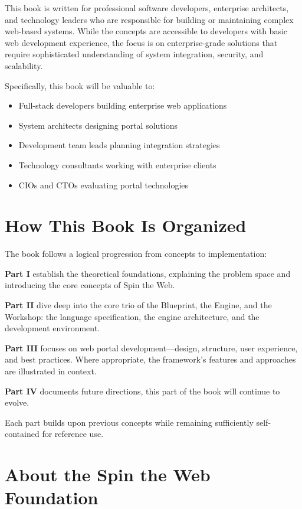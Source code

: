 This book is written for professional software developers, enterprise architects, and technology leaders who are responsible for building or maintaining complex web-based systems. While the concepts are accessible to developers with basic web development experience, the focus is on enterprise-grade solutions that require sophisticated understanding of system integration, security, and scalability.

Specifically, this book will be valuable to:
\begin{itemize}
\item Full-stack developers building enterprise web applications
\item System architects designing portal solutions
\item Development team leads planning integration strategies
\item Technology consultants working with enterprise clients
\item CIOs and CTOs evaluating portal technologies
\end{itemize}

\section*{How This Book Is Organized}

The book follows a logical progression from concepts to implementation:

\textbf{Part I} establish the theoretical foundations, explaining the problem space and introducing the core concepts of Spin the Web.

\textbf{Part II} dive deep into the core trio of the Blueprint, the Engine, and the Workshop: the \wbdl language specification, the \webspinner engine architecture, and the \studio development environment.

\textbf{Part III} focuses on web portal development—design, structure, user experience, and best practices. Where appropriate, the framework’s features and approaches are illustrated in context.

\textbf{Part IV} documents future directions, this part of the book will continue to evolve.

Each part builds upon previous concepts while remaining sufficiently self-contained for reference use.

\section*{About the Spin the Web Foundation}

